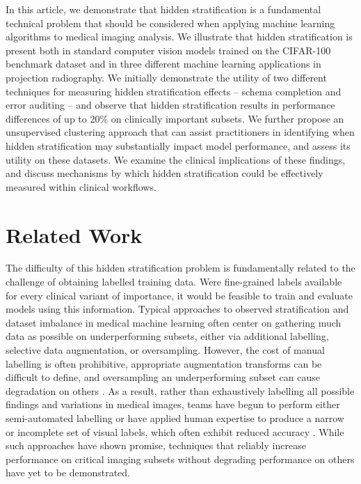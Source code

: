 \documentclass{article}
\begin{document}
In this article, we demonstrate that hidden stratification is a fundamental technical problem that should be considered when applying machine learning algorithms to medical imaging analysis.  
We illustrate that hidden stratification is present both in standard computer vision models trained on the CIFAR-100 benchmark dataset and in three different machine learning applications in projection radiography.  
We initially demonstrate the utility of two different techniques for measuring hidden stratification effects -- schema completion and error auditing -- and observe that  hidden stratification results in performance differences of up to 20\% on clinically important subsets.  
We further propose an unsupervised clustering approach that can assist practitioners in identifying when hidden stratification may substantially impact model performance, and assess its utility on these datasets.
We examine the clinical implications of these findings, and discuss mechanisms by which hidden stratification could be effectively measured within clinical workflows.

\section{Related Work}

The difficulty of this hidden stratification problem is fundamentally related to the challenge of obtaining labelled training data.  
Were fine-grained labels available for every clinical variant of importance, it would be feasible to train and evaluate models using this information.  
Typical approaches to observed stratification and dataset imbalance in medical machine learning often center on gathering much data as possible on underperforming subsets, either via additional labelling, selective data augmentation, or oversampling\citep{Mazurowski2008-cq}.  
However, the cost of manual labelling is often prohibitive, appropriate augmentation transforms can be difficult to define, and oversampling an underperforming subset can cause degradation on others \citep{Fries2019-ze, Ratner2017-td,Agniel2018-qp, Buda2018-ab, Zech2018-xq}.  
As a result, rather than exhaustively labelling all possible findings and variations in medical images, teams have begun to perform either semi-automated labelling \citep{Wang2017-vm, Fries2019-ze, Irvin2019-ho, Chilamkurthy2018-op, Dunnmon2019-zw, Fries2019-ze}  or have applied human expertise to produce a narrow or incomplete set of visual labels, which often exhibit reduced accuracy \citep{Oakden-Rayner2019-yi}.  
While such approaches have shown promise, techniques that reliably increase performance on critical imaging subsets without degrading performance on others have yet to be demonstrated.
 
\end{document}
